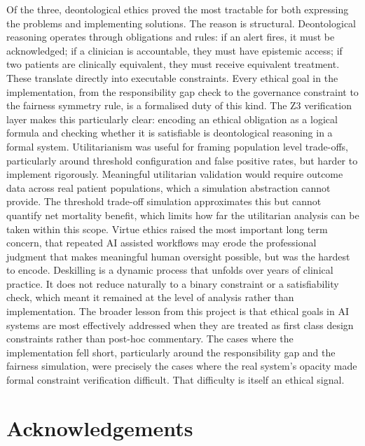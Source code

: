 \documentclass[]{UCD_CS_41820_Report}
\begin{document}
Of the three, deontological ethics proved the most tractable for both expressing the
problems and implementing solutions. The reason is structural. Deontological
reasoning operates through obligations and rules: if an alert fires, it must be
acknowledged; if a clinician is accountable, they must have epistemic access; if two
patients are clinically equivalent, they must receive equivalent treatment. These
translate directly into executable constraints. Every ethical goal in the
implementation, from the responsibility gap check to the governance constraint to
the fairness symmetry rule, is a formalised duty of this kind. The Z3 verification
layer makes this particularly clear: encoding an ethical obligation as a logical
formula and checking whether it is satisfiable is deontological reasoning in a
formal system.
\medskip
Utilitarianism was useful for framing population level trade-offs, particularly
around threshold configuration and false positive rates, but harder to implement
rigorously. Meaningful utilitarian validation would require outcome data across real
patient populations, which a simulation abstraction cannot provide. The threshold
trade-off simulation approximates this but cannot quantify net mortality benefit,
which limits how far the utilitarian analysis can be taken within this scope.
\medskip
Virtue ethics raised the most important long term concern, that repeated AI assisted
workflows may erode the professional judgment that makes meaningful human oversight
possible, but was the hardest to encode. Deskilling is a dynamic process that
unfolds over years of clinical practice. It does not reduce naturally to a binary
constraint or a satisfiability check, which meant it remained at the level of
analysis rather than implementation.
\medskip
The broader lesson from this project is that ethical goals in AI systems are most
effectively addressed when they are treated as first class design constraints rather
than post-hoc commentary. The cases where the implementation fell short, particularly
around the responsibility gap and the fairness simulation, were precisely the cases
where the real system's opacity made formal constraint verification difficult. That
difficulty is itself an ethical signal.
\chapter*{Acknowledgements}
\end{document}
